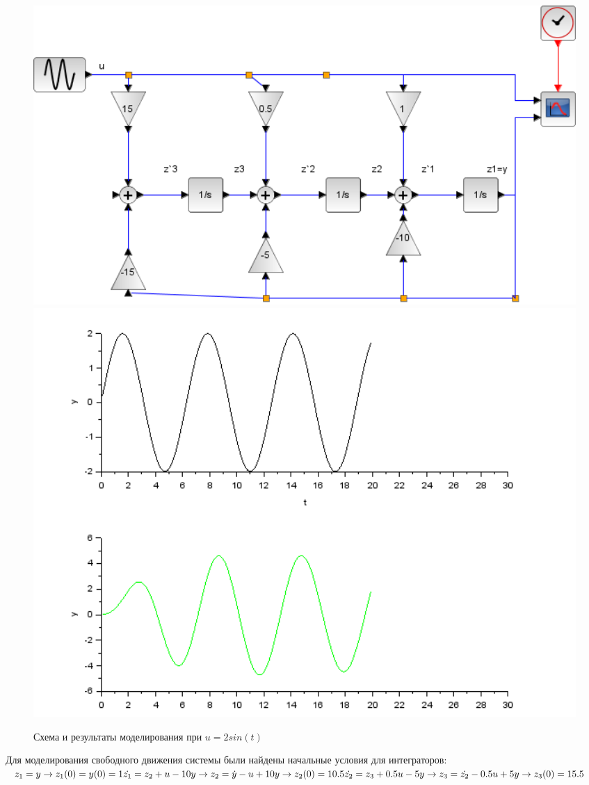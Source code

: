 \documentclass[a4paper,12pt,russian]{article} %
\begin{document}
\begin{figure}[H]
	\includegraphics[width=1\textwidth]{вход-выход-схема-sin}
	\includegraphics[width=1\textwidth]{вход-выход-sin}
	\caption{Схема и результаты моделирования при   $u=2sin(t)$}
\end{figure}
Для моделирования свободного движения системы были найдены начальные условия для интеграторов:\\
$z_1=y \rightarrow z_1(0)=y(0)=1\\
\dot{z_1}=z_2+u-10y \rightarrow z_2=\dot{y}-u+10y \rightarrow z_2(0)=10.5\\
\dot{z_2}=z_3+0.5u-5y \rightarrow z_3=\dot{z_2}-0.5u+5y \rightarrow z_3(0)=15.5\\$
\end{document}
